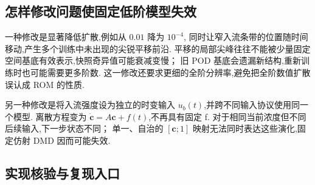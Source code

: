 \documentclass[UTF8,a4paper,11pt,fontset=fandol]{ctexart}
\numberwithin{equation}{section}
\newcommand{\cc}{\bm{c}}
\begin{document}


\subsection{怎样修改问题使固定低阶模型失效}
一种修改是显著降低扩散,例如从 $0.01$ 降为 $10^{-4}$,
同时让窄入流条带的位置随时间移动,产生多个训练中未出现的尖锐平移前沿.
平移的局部尖峰往往不能被少量固定空间基底有效表示,快照奇异值可能衰减变慢；
旧 POD 基底会遗漏新结构,重新训练时也可能需要更多阶数.
这一修改还要求更细的全阶分辨率,避免把全阶数值扩散误认成 ROM 的性质.

另一种修改是将入流强度设为独立的时变输入 $u_b(t)$,并跨不同输入协议使用同一个模型.
离散方程变为 $\dot{\cc}=A\cc+f(t)$,不再具有固定 f.
对于相同当前浓度但不同后续输入,下一步状态不同；
单一、自治的 $[\cc;1]$ 映射无法同时表达这些演化,固定仿射 DMD 因而可能失效.

\subsection{实现核验与复现入口}
\end{document}
